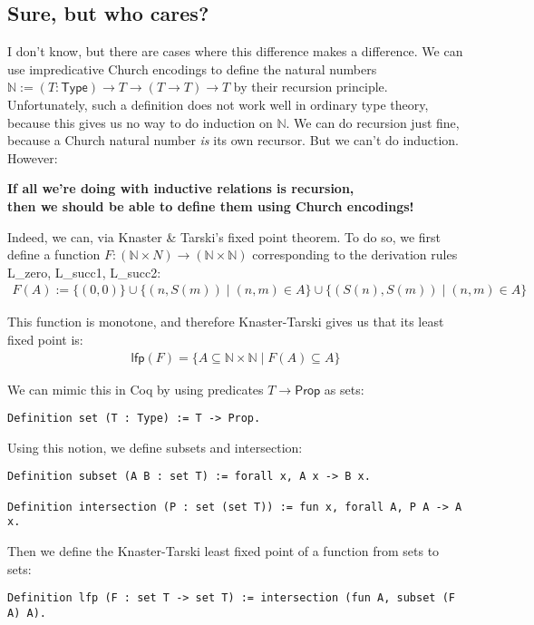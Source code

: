 \documentclass[a4paper, 11pt]{article}
\newcommand{\N}{\mathbb{N}}
\theoremstyle{definition}
\begin{document}
\subsection*{Sure, but who cares?}

I don't know, but there are cases where this difference makes a difference. We can use impredicative Church encodings to define the natural numbers $\N := (T : \mathsf{Type}) \to T \to (T \to T) \to T$ by their recursion principle. Unfortunately, such a definition does not work well in ordinary type theory, because this gives us no way to do induction on $\N$. We can do recursion just fine, because a Church natural number \emph{is} its own recursor. But we can't do induction. However:

\begin{center}
  \textbf{If all we're doing with inductive relations is recursion,\\ then we should be able to define them using Church encodings!}
\end{center}

Indeed, we can, via Knaster \& Tarski's fixed point theorem. To do so, we first define a function $F : (\N \times N) \to (\N \times \N)$ corresponding to the derivation rules L\_zero, L\_succ1, L\_succ2:
\begin{align*}
  F(A) := \{(0,0)\} \cup
    \{(n,S(m)) \mid (n,m) \in A\} \cup
    \{(S(n),S(m)) \mid (n,m) \in A\}
\end{align*}

This function is monotone, and therefore Knaster-Tarski gives us that its least fixed point is:
\begin{align*}
  \mathsf{lfp}(F) = \{ A \subseteq \N \times \N \mid F(A) \subseteq A \}
\end{align*}

We can mimic this in Coq by using predicates $T \to \mathsf{Prop}$ as sets:

\begin{lstlisting}
Definition set (T : Type) := T -> Prop.
\end{lstlisting}

Using this notion, we define subsets and intersection:
\begin{lstlisting}
Definition subset (A B : set T) := forall x, A x -> B x.

Definition intersection (P : set (set T)) := fun x, forall A, P A -> A x.
\end{lstlisting}

Then we define the Knaster-Tarski least fixed point of a function from sets to sets:
\begin{lstlisting}
Definition lfp (F : set T -> set T) := intersection (fun A, subset (F A) A).
\end{lstlisting}
\end{document}
